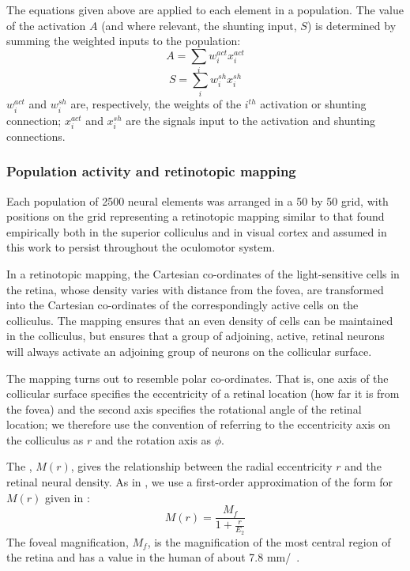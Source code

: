 \documentclass{frontiersSCNS}
\begin{document}
The equations given above are applied to each element in a
population. The value of the activation $A$ (and where relevant, the
shunting input, $S$) is determined by summing the weighted inputs to
the population:
\begin{equation}
A = \sum_{i}w_i^{act} x_i^{act}
\end{equation}
\begin{equation}
S = \sum_{i}w_i^{sh} x_i^{sh}
\end{equation}
$w_i^{act}$ and $w_i^{sh}$ are, respectively, the weights of the
$i^{th}$ activation or shunting connection; $x_i^{act}$ and $x_i^{sh}$
are the signals input to the activation and shunting connections.

\subsubsection{Population activity and retinotopic mapping}
\label{sec:mapping}

Each population of 2500 neural elements was arranged in a 50 by 50
grid, with positions on the grid representing a retinotopic mapping
similar to that found empirically both in the superior
colliculus \citep{ottes_visuomotor_1986} and in visual cortex
\citep{eric_l._schwartz_computational_1980}
and assumed in this work to persist throughout the oculomotor system.

In a retinotopic mapping, the Cartesian co-ordinates of the
light-sensitive cells in the retina, whose density varies with
distance from the fovea, are transformed into the Cartesian
co-ordinates of the correspondingly active cells on the
colliculus. The mapping ensures that an even density of cells can be
maintained in the colliculus, but ensures that a group of adjoining,
active, retinal neurons will always activate an adjoining group of
neurons on the collicular surface.

The mapping turns out to resemble polar co-ordinates. That is, one
axis of the collicular surface specifies the eccentricity of a retinal
location (how far it is from the fovea) and the second axis specifies
the rotational angle of the retinal location; we therefore use the
convention of referring to the eccentricity axis on the colliculus as
$r$ and the rotation axis as $\phi$.

The , $M(r)$, gives the relationship
between the radial eccentricity $r$ and the retinal neural density. As
in
\cite{cope_basal_2017}, we use a first-order approximation of the form
for $M(r)$ given in \cite{rovamo_estimation_1979}:
\begin{equation} \label{eq:cmf}
M(r) = \frac{M_f}{1+\frac{r}{E_2}}
\end{equation}
The foveal magnification, $M_f$, is the magnification of the most
central region of the retina and has a value in the human of about 7.8
mm/\dg~\citep{rovamo_estimation_1979}.
\end{document}
